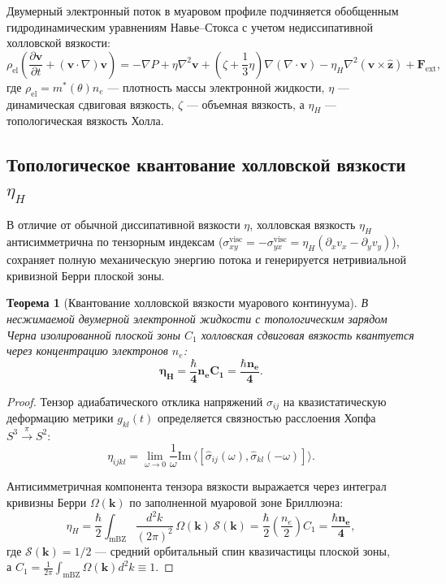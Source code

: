 \documentclass[12pt,a4paper]{article}
\newtheorem{theorem}{Теорема}
\begin{document}
Двумерный электронный поток в муаровом профиле подчиняется обобщенным гидродинамическим уравнениям Навье--Стокса с учетом недиссипативной холловской вязкости:
\begin{equation}
	\rho_{\text{el}} \left( \frac{\partial \mathbf{v}}{\partial t} + (\mathbf{v} \cdot \nabla)\mathbf{v} \right) = -\nabla P + \eta \nabla^2 \mathbf{v} + \left( \zeta + \frac{1}{3}\eta \right) \nabla(\nabla \cdot \mathbf{v}) - \eta_H \nabla^2 (\mathbf{v} \times \hat{\mathbf{z}}) + \mathbf{F}_{\text{ext}},
\end{equation}
где $\rho_{\text{el}} = m^*(\theta) n_e$ — плотность массы электронной жидкости, $\eta$ — динамическая сдвиговая вязкость, $\zeta$ — объемная вязкость, а $\eta_H$ — топологическая вязкость Холла.

\subsection{Топологическое квантование холловской вязкости $\eta_H$}
В отличие от обычной диссипативной вязкости $\eta$, холловская вязкость $\eta_H$ антисимметрична по тензорным индексам ($\sigma_{xy}^{\text{visc}} = -\sigma_{yx}^{\text{visc}} = \eta_H (\partial_x v_x - \partial_y v_y)$), сохраняет полную механическую энергию потока и генерируется нетривиальной кривизной Берри плоской зоны.

\begin{theorem}[Квантование холловской вязкости муарового континуума]
	В несжимаемой двумерной электронной жидкости с топологическим зарядом Черна изолированной плоской зоны $C_1$ холловская сдвиговая вязкость квантуется через концентрацию электронов $n_e$:
	\begin{equation}
		\mathbf{\eta_H = \frac{\hbar}{4} n_e C_1 = \frac{\hbar n_e}{4}}.
	\end{equation}
\end{theorem}

\begin{proof}
	Тензор адиабатического отклика напряжений $\sigma_{ij}$ на квазистатическую деформацию метрики $g_{kl}(t)$ определяется связностью расслоения Хопфа $S^3 \xrightarrow{\pi} S^2$:
	\begin{equation}
		\eta_{ijkl} = \lim_{\omega \to 0} \frac{1}{\omega} \mathrm{Im} \, \langle [ \hat{\sigma}_{ij}(\omega), \hat{\sigma}_{kl}(-\omega) ] \rangle.
	\end{equation}
	
	Антисимметричная компонента тензора вязкости выражается через интеграл кривизны Берри $\Omega(\mathbf{k})$ по заполненной муаровой зоне Бриллюэна:
	\begin{equation}
		\eta_H = \frac{\hbar}{2} \int_{\text{mBZ}} \frac{d^2k}{(2\pi)^2} \, \Omega(\mathbf{k}) \, \mathcal{S}(\mathbf{k}) = \frac{\hbar}{2} \left( \frac{n_e}{2} \right) C_1 = \mathbf{\frac{\hbar n_e}{4}},
	\end{equation}
	где $\mathcal{S}(\mathbf{k}) = 1/2$ — средний орбитальный спин квазичастицы плоской зоны,\\ а $C_1 = \frac{1}{2\pi}\int_{\text{mBZ}} \Omega(\mathbf{k}) d^2k \equiv 1$.
\end{proof}
\end{document}
